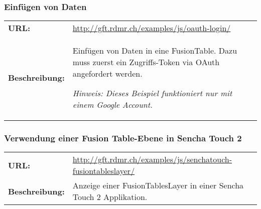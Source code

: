 \subsubsection{Einfügen von Daten}
\begin{tabular}{p{0.2\twocelltabwidth}p{0.8\twocelltabwidth}}
\textbf{URL:} & \url{http://gft.rdmr.ch/examples/js/oauth-login/} \\ 
\textbf{Beschreibung:} & Einfügen von Daten in eine FusionTable. Dazu muss zuerst ein Zugriffs-Token via \gls{OAuth} angefordert werden.

\textit{Hinweis: Dieses Beispiel funktioniert nur mit einem Google Account.} \\ 
\end{tabular} 

\subsubsection{Verwendung einer Fusion Table-Ebene in Sencha Touch 2}
\begin{tabular}{p{0.2\twocelltabwidth}p{0.8\twocelltabwidth}}
\textbf{URL:} & \url{http://gft.rdmr.ch/examples/js/senchatouch-fusiontableslayer/} \\ 
\textbf{Beschreibung:} & Anzeige einer FusionTablesLayer in einer Sencha Touch 2 Applikation. \\ 
\end{tabular} 